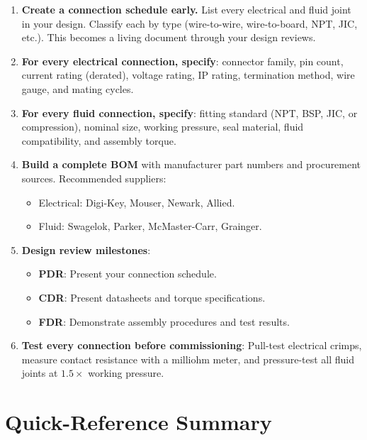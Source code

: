 \documentclass[11pt,letterpaper,twoside,openany]{book}
\begin{document}
\begin{enumerate}[leftmargin=1.5em]
  \item \textbf{Create a connection schedule early.} List every electrical and fluid joint in your design. Classify each by type (wire-to-wire, wire-to-board, NPT, JIC, etc.). This becomes a living document through your design reviews.

  \item \textbf{For every electrical connection, specify}: connector family, pin count, current rating (derated), voltage rating, IP rating, termination method, wire gauge, and mating cycles.

  \item \textbf{For every fluid connection, specify}: fitting standard (NPT, BSP, JIC, or compression), nominal size, working pressure, seal material, fluid compatibility, and assembly torque.

  \item \textbf{Build a complete BOM} with manufacturer part numbers and procurement sources. Recommended suppliers:
  \begin{itemize}[nosep]
    \item Electrical: Digi-Key, Mouser, Newark, Allied.
    \item Fluid: Swagelok, Parker, McMaster-Carr, Grainger.
  \end{itemize}

  \item \textbf{Design review milestones}:
  \begin{itemize}[nosep]
    \item \textbf{PDR}: Present your connection schedule.
    \item \textbf{CDR}: Present datasheets and torque specifications.
    \item \textbf{FDR}: Demonstrate assembly procedures and test results.
  \end{itemize}

  \item \textbf{Test every connection before commissioning}: Pull-test electrical crimps, measure contact resistance with a milliohm meter, and pressure-test all fluid joints at $1.5\times$ working pressure.
\end{enumerate}


\section{Quick-Reference Summary}
\end{document}
